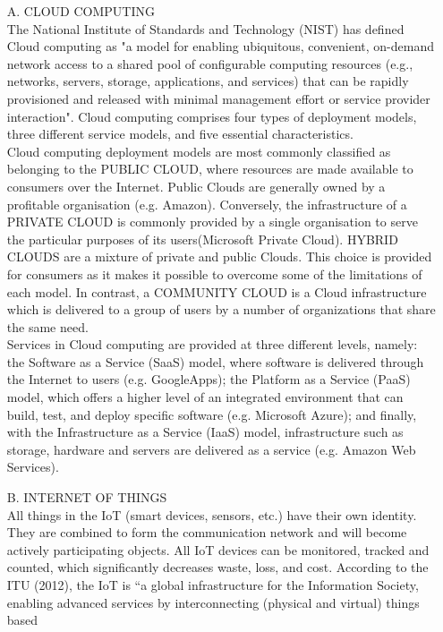 \documentclass[11pt]{article}
\begin{document}
\begin{itemize}
    \item[A.] CLOUD COMPUTING\\
    The National Institute of Standards and
Technology (NIST) has defined Cloud computing as "a model for enabling ubiquitous, convenient, on-demand network access to a shared pool of configurable computing resources (e.g., networks, servers, storage, applications, and services) that can be rapidly provisioned and released with minimal management effort or service provider interaction".
Cloud computing comprises four types of deployment models, three different service models, and five essential characteristics.\\
Cloud computing deployment models are most commonly
classified as belonging to the PUBLIC CLOUD, where resources
are made available to consumers over the Internet. Public
Clouds are generally owned by a profitable organisation (e.g.
Amazon). Conversely, the infrastructure of a PRIVATE CLOUD is commonly provided by a single organisation to serve
the particular purposes of its users(Microsoft
Private Cloud). HYBRID CLOUDS are a mixture of private and
public Clouds. This choice is provided for consumers as it
makes it possible to overcome some of the limitations of each
model. In contrast, a COMMUNITY CLOUD is a Cloud
infrastructure which is delivered to a group of users by a number of organizations that share the same need.\\
Services in Cloud computing are provided at three
different levels, namely: the Software as a Service (SaaS)
model, where software is delivered through the Internet to
users (e.g. GoogleApps); the Platform as a Service (PaaS)
model, which offers a higher level of an integrated environment
that can build, test, and deploy specific software (e.g.
Microsoft Azure); and finally, with the Infrastructure as a
Service (IaaS) model, infrastructure such as storage, hardware
and servers are delivered as a service (e.g. Amazon Web
Services). 
    \item[B.] INTERNET OF THINGS\\
All things in the IoT (smart devices, sensors, etc.) have their own identity. They are combined to form the communication network and will become actively participating objects. All IoT devices can be monitored, tracked and counted, which significantly decreases waste, loss, and cost.
According to the ITU (2012), the IoT is “a global
infrastructure for the Information Society, enabling advanced
services by interconnecting (physical and virtual) things based

\end{itemize}
\end{document}
